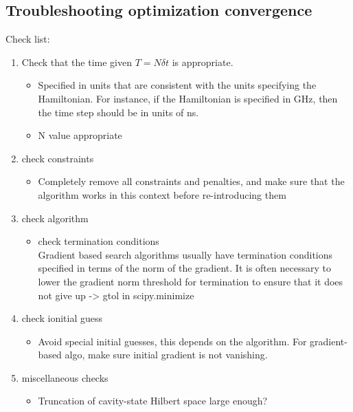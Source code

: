 \documentclass[12pt]{article}
\begin{document}
\subsection{Troubleshooting optimization convergence}
Check list: 
\begin{enumerate}
    \item Check that the time given $T = N \delta t$ is appropriate.
        \begin{itemize}
            \item Specified in units that are consistent with the units specifying the Hamiltonian. For instance, if the Hamiltonian is specified in GHz, then the time step should be in units of ns.
            \item N value appropriate
        \end{itemize}
    \item check constraints
        \begin{itemize}
            \item Completely remove all constraints and penalties, and make sure that the algorithm works in this context before re-introducing them
        \end{itemize}
    \item check algorithm 
        \begin{itemize}
            \item check termination conditions \\
            Gradient based search algorithms usually have termination conditions specified in terms of the norm of the gradient. It is often necessary to lower the gradient norm threshold for termination to ensure that it does not give up -> gtol in scipy.minimize

        \end{itemize}
    \item check ionitial guess
        \begin{itemize}
            \item Avoid special initial guesses, this depends on the algorithm. 
                For gradient-based algo, make sure initial gradient is not vanishing.
        \end{itemize}
    \item miscellaneous checks
        \begin{itemize}
            \item Truncation of cavity-state Hilbert space large enough? 
        \end{itemize}
\end{enumerate}
\end{document}
